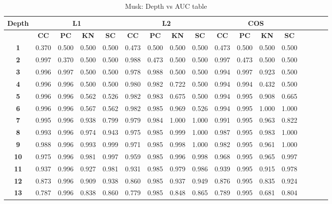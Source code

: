 \begin{table*}[!t]
\caption{Musk: Depth vs AUC table}
\label{comparisons:musk}
\centering
\begin{tabular}{|c|c|c|c|c|c|c|c|c|c|c|c|c|c|c|c|c|}
\hline
\bfseries Depth & \multicolumn{4}{c|}{\textbf{L1}} & \multicolumn{4}{c|}{\textbf{L2}} & \multicolumn{4}{c|}{\textbf{COS}} \\
\hline
\bfseries  & \bfseries CC & \bfseries PC & \bfseries KN & \bfseries SC & \bfseries CC & \bfseries PC & \bfseries KN & \bfseries SC & \bfseries CC & \bfseries PC & \bfseries KN & \bfseries SC \\
\hline
\bfseries 1 & 0.370 & 0.500 & 0.500 & 0.500 & 0.473 & 0.500 & 0.500 & 0.500 & 0.473 & 0.500 & 0.500 & 0.500 \\
\hline
\bfseries 2 & 0.997 & 0.370 & 0.500 & 0.500 & 0.988 & 0.473 & 0.500 & 0.500 & 0.997 & 0.473 & 0.500 & 0.500 \\
\hline
\bfseries 3 & 0.996 & 0.997 & 0.500 & 0.500 & 0.978 & 0.988 & 0.500 & 0.500 & 0.994 & 0.997 & 0.923 & 0.500 \\
\hline
\bfseries 4 & 0.996 & 0.996 & 0.500 & 0.500 & 0.980 & 0.982 & 0.722 & 0.500 & 0.994 & 0.994 & 0.432 & 0.500 \\
\hline
\bfseries 5 & 0.996 & 0.996 & 0.562 & 0.526 & 0.982 & 0.983 & 0.675 & 0.500 & 0.994 & 0.995 & 0.908 & 0.665 \\
\hline
\bfseries 6 & 0.996 & 0.996 & 0.567 & 0.562 & 0.982 & 0.985 & 0.969 & 0.526 & 0.994 & 0.995 & 1.000 & 1.000 \\
\hline
\bfseries 7 & 0.995 & 0.996 & 0.938 & 0.799 & 0.979 & 0.984 & 1.000 & 1.000 & 0.991 & 0.995 & 0.963 & 0.822 \\
\hline
\bfseries 8 & 0.993 & 0.996 & 0.974 & 0.943 & 0.975 & 0.985 & 0.999 & 1.000 & 0.987 & 0.995 & 0.983 & 1.000 \\
\hline
\bfseries 9 & 0.988 & 0.996 & 0.993 & 0.999 & 0.971 & 0.985 & 0.998 & 1.000 & 0.982 & 0.995 & 0.961 & 1.000 \\
\hline
\bfseries 10 & 0.975 & 0.996 & 0.981 & 0.997 & 0.959 & 0.985 & 0.996 & 0.998 & 0.968 & 0.995 & 0.965 & 0.997 \\
\hline
\bfseries 11 & 0.937 & 0.996 & 0.927 & 0.981 & 0.931 & 0.985 & 0.979 & 0.986 & 0.939 & 0.995 & 0.915 & 0.978 \\
\hline
\bfseries 12 & 0.873 & 0.996 & 0.909 & 0.938 & 0.860 & 0.985 & 0.937 & 0.949 & 0.876 & 0.995 & 0.835 & 0.924 \\
\hline
\bfseries 13 & 0.787 & 0.996 & 0.838 & 0.860 & 0.779 & 0.985 & 0.848 & 0.865 & 0.789 & 0.995 & 0.681 & 0.804 \\

\end{tabular}
\end{table*}
